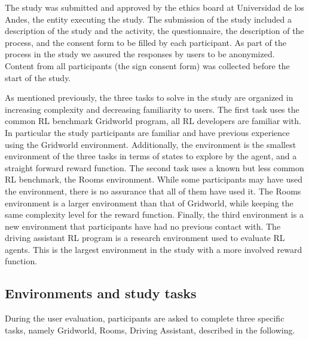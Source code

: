 The study was submitted and approved by the ethics board at Universidad de los Andes, the entity 
executing the study. The submission of the study included a description of the study and the activity, 
the questionnaire, the description of the process, and the consent form to be filled by each participant.
As part of the process in the study we assured the responses by users to be anonymized. Content 
from all participants (\ie the sign consent form) was collected before the start of the study. 

As mentioned previously, the three tasks to solve in the study are organized in increasing complexity 
and decreasing familiarity to users. The first task uses the common \ac{RL} benchmark Gridworld 
program, all \ac{RL} developers are familiar with. In particular the study participants are familiar and 
have previous experience using the Gridworld environment. Additionally, the environment is the 
smallest environment of the three tasks in terms of states to explore by the agent, and a straight 
forward reward function. The second task uses a known but less common \ac{RL} benchmark, the 
Rooms environment. While some participants may have used the environment, there is no assurance 
that all of them have used it. The Rooms environment is a larger environment than that of Gridworld, 
while keeping the same complexity level for the reward function. Finally, the third environment is a new 
environment that participants have had no previous contact with. The driving assistant \ac{RL} 
program is a research environment used to evaluate \ac{RL} agents. This is the largest environment 
in the study with a more involved reward function.


\subsection{Environments and study tasks}
\label{see:tasks}

During the user evaluation, participants are asked to complete three specific tasks, namely Gridworld, 
Rooms, Driving Assistant, described in the following.

